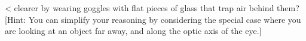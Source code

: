 <%
clearer by wearing goggles with flat pieces of glass that
trap air behind them? [Hint: You can simplify your reasoning
by considering the special case where you are looking at an
object far away, and along the optic axis of the eye.]
